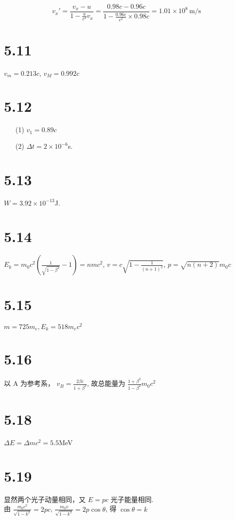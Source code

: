 \documentclass{article}
\begin{document}
\[v_x' = \frac{v_x - u}{1 - \frac{u}{c^2} v_x} = \frac{0.98c - 0.96c}{1 - \frac{0.96c}{c^2} \times 0.98c} = 1.01 \times 10^8 \, \text{m/s}\]

\section*{5.11}

$v_m = 0.213c$, $v_M = 0.992c$

\section*{5.12}

\begin{itemize}
    \item [(1)] $v_1 = 0.89c$
    \item [(2)] $\Delta t = 2 \times 10^{-6}$s.
\end{itemize}

\section*{5.13}

$W = 3.92 \times 10^{-13}$J.

\section*{5.14}

$E_k = m_0c^2\left(\frac{1}{\sqrt{1 - \beta^2}} - 1\right) = nmc^2$, $v = c\sqrt{1 - \frac{1}{(n + 1)^2}}$, $p = \sqrt{n(n + 2)}m_0c$

\section*{5.15}

$m = 725m_e, E_k = 518m_ec^2$

\section*{5.16}

以 A 为参考系， $v_B = \frac{2\beta c}{1 + \beta^2}$, 故总能量为 $\frac{1 + \beta^2}{1 - \beta^2}m_0c^2$

\section*{5.18}

$\Delta E = \Delta m c^2 = 5.5$MeV

\section*{5.19}

显然两个光子动量相同，又 $E = pc$ 光子能量相同. \\
由 $\frac{m_0c^2}{\sqrt{1 - k^2}} = 2pc$, $\frac{m_0v}{\sqrt{1 - k^2}} = 2p \cos \theta$, 得 $\cos \theta = k$
\end{document}
